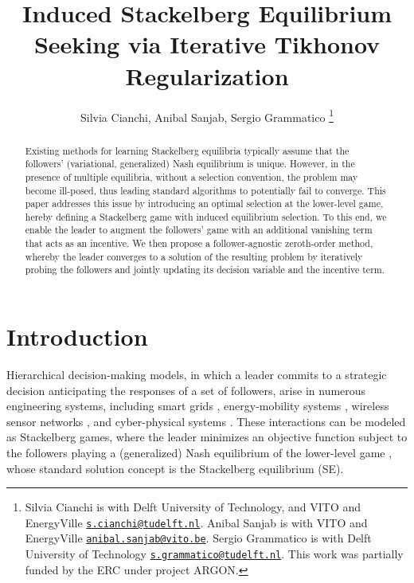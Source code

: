 \documentclass[letterpaper, 10 pt, conference]{ieeeconf}
\begin{document}
\title{\LARGE \bf Induced Stackelberg Equilibrium Seeking via Iterative Tikhonov Regularization}

\author{Silvia Cianchi, Anibal Sanjab, Sergio Grammatico \thanks{ Silvia Cianchi is with Delft University of Technology, and VITO and EnergyVille  \href{mailto:s.cianchi@tudelft.nl}{\texttt{s.cianchi@tudelft.nl}}. Anibal Sanjab is with VITO and EnergyVille \href{mailto:anibal.sanjab@vito.be}{\texttt{anibal.sanjab@vito.be}}. Sergio Grammatico is with Delft University of Technology \href{mailto:s.grammatico@tudelft.nl}{\texttt{s.grammatico@tudelft.nl}}. This work was partially funded by the ERC under project ARGON.}}
\maketitle

\begin{abstract}
Existing methods for learning Stackelberg equilibria typically assume that the followers’ (variational, generalized) Nash equilibrium is unique. However, in the presence of multiple equilibria, without a selection convention, the problem may become ill-posed, thus leading standard algorithms to potentially fail to converge. This paper addresses this issue by introducing an optimal selection at the lower-level game, hereby defining a Stackelberg game with induced equilibrium selection. To this end, we enable the leader to augment the followers’ game with an additional vanishing term that acts as an incentive. We then propose a follower-agnostic zeroth-order method, whereby the leader converges to a solution of the resulting problem by iteratively probing the followers and jointly updating its decision variable and the incentive term.

\end{abstract}
\section{Introduction} 
Hierarchical decision-making models, in which a leader commits to a strategic decision anticipating the responses of a set of followers, arise in numerous engineering systems, including smart grids \cite{fochesato2022stackelberg, yu2015real}, energy-mobility systems \cite{maljkovic2023hierarchical}, wireless sensor networks \cite{nie2018stackelberg}, and cyber-physical systems \cite{xing2024denial, 7446354, 9144263}. These interactions can be modeled as Stackelberg games, where the leader minimizes an objective function subject to the followers playing a (generalized) Nash equilibrium of the lower-level game \cite{von2010market}, whose standard solution concept is the Stackelberg equilibrium (SE). 
\end{document}
